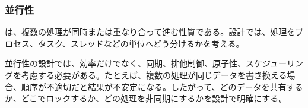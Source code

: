 \subsubsection{並行性}

 は、複数の処理が同時または重なり合って進む性質である。設計では、処理をプロセス、タスク、スレッドなどの単位へどう分けるかを考える。

並行性の設計では、効率だけでなく、同期、排他制御、原子性、スケジューリングを考慮する必要がある。たとえば、複数の処理が同じデータを書き換える場合、順序が不適切だと結果が不安定になる。したがって、どのデータを共有するか、どこでロックするか、どの処理を非同期にするかを設計で明確にする。
